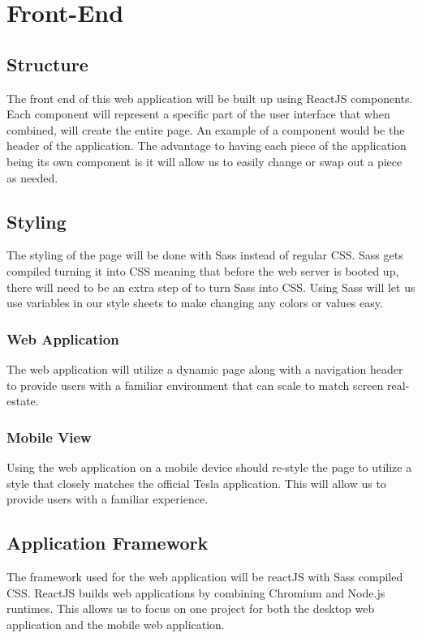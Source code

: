 \documentclass[onecolumn, draftclsnofoot,10pt, compsoc]{IEEEtran}
\begin{document}
\section{Front-End}
    \subsection{Structure}
        The front end of this web application will be built up using ReactJS components.
        Each component will represent a specific part of the user interface that when combined, will create the entire page.
        An example of a component would be the header of the application.
        The advantage to having each piece of the application being its own component is it will allow us to easily change or swap out a piece as needed.
    \subsection{Styling}
        The styling of the page will be done with Sass instead of regular CSS.
        Sass gets compiled turning it into CSS meaning that before the web server is booted up, there will need to be an extra step of to turn Sass into CSS.
        Using Sass will let us use variables in our style sheets to make changing any colors or values easy.
        \subsubsection{Web Application}
            The web application will utilize a dynamic page along with a navigation header to provide users with a familiar environment that can scale to match screen real-estate. 
        \subsubsection{Mobile View}
            Using the web application on a mobile device should re-style the page to utilize a style that closely matches the official Tesla application. This will allow us to provide users with a familiar experience.
    \subsection{Application Framework}
        The framework used for the web application will be reactJS with Sass compiled CSS. ReactJS builds web applications by combining Chromium and Node.js runtimes. This allows us to focus on one project for both the desktop web application and the mobile web application.
\end{document}
